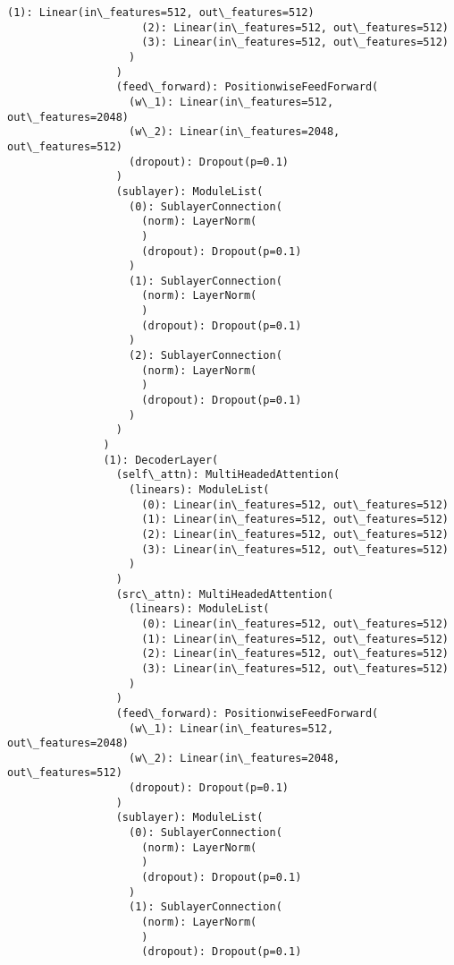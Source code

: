 \documentclass[11pt]{article}
\begin{document}
\begin{Verbatim}[commandchars=\\\{\}]
                     (1): Linear(in\_features=512, out\_features=512)
                     (2): Linear(in\_features=512, out\_features=512)
                     (3): Linear(in\_features=512, out\_features=512)
                   )
                 )
                 (feed\_forward): PositionwiseFeedForward(
                   (w\_1): Linear(in\_features=512, out\_features=2048)
                   (w\_2): Linear(in\_features=2048, out\_features=512)
                   (dropout): Dropout(p=0.1)
                 )
                 (sublayer): ModuleList(
                   (0): SublayerConnection(
                     (norm): LayerNorm(
                     )
                     (dropout): Dropout(p=0.1)
                   )
                   (1): SublayerConnection(
                     (norm): LayerNorm(
                     )
                     (dropout): Dropout(p=0.1)
                   )
                   (2): SublayerConnection(
                     (norm): LayerNorm(
                     )
                     (dropout): Dropout(p=0.1)
                   )
                 )
               )
               (1): DecoderLayer(
                 (self\_attn): MultiHeadedAttention(
                   (linears): ModuleList(
                     (0): Linear(in\_features=512, out\_features=512)
                     (1): Linear(in\_features=512, out\_features=512)
                     (2): Linear(in\_features=512, out\_features=512)
                     (3): Linear(in\_features=512, out\_features=512)
                   )
                 )
                 (src\_attn): MultiHeadedAttention(
                   (linears): ModuleList(
                     (0): Linear(in\_features=512, out\_features=512)
                     (1): Linear(in\_features=512, out\_features=512)
                     (2): Linear(in\_features=512, out\_features=512)
                     (3): Linear(in\_features=512, out\_features=512)
                   )
                 )
                 (feed\_forward): PositionwiseFeedForward(
                   (w\_1): Linear(in\_features=512, out\_features=2048)
                   (w\_2): Linear(in\_features=2048, out\_features=512)
                   (dropout): Dropout(p=0.1)
                 )
                 (sublayer): ModuleList(
                   (0): SublayerConnection(
                     (norm): LayerNorm(
                     )
                     (dropout): Dropout(p=0.1)
                   )
                   (1): SublayerConnection(
                     (norm): LayerNorm(
                     )
                     (dropout): Dropout(p=0.1)

\end{Verbatim}
\end{document}
